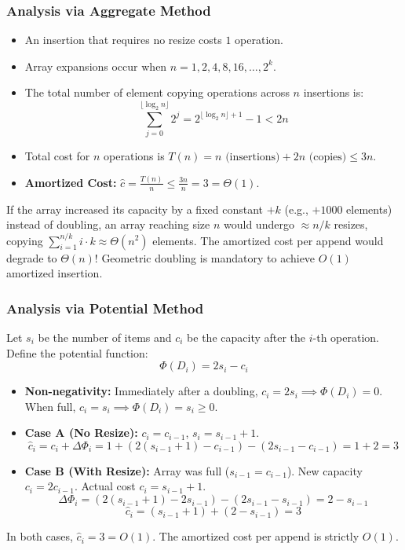 \documentclass[11pt,a4paper]{article}
\begin{document}
\subsubsection{Analysis via Aggregate Method}
\begin{itemize}[itemsep=2pt]
    \item An insertion that requires no resize costs $1$ operation.
    \item Array expansions occur when $n = 1, 2, 4, 8, 16, \dots, 2^k$.
    \item The total number of element copying operations across $n$ insertions is:
    \[
    \sum_{j=0}^{\lfloor \log_2 n \rfloor} 2^j = 2^{\lfloor \log_2 n \rfloor + 1} - 1 < 2n
    \]
    \item Total cost for $n$ operations is $T(n) = n \text{ (insertions)} + 2n \text{ (copies)} \le 3n$.
    \item \textbf{Amortized Cost:} $\hat{c} = \frac{T(n)}{n} \le \frac{3n}{n} = 3 = \Theta(1)$.
\end{itemize}

\begin{notebox}
If the array increased its capacity by a fixed constant $+k$ (e.g., $+1000$ elements) instead of doubling, an array reaching size $n$ would undergo $\approx n/k$ resizes, copying $\sum_{i=1}^{n/k} i \cdot k \approx \Theta(n^2)$ elements. The amortized cost per append would degrade to $\Theta(n)$! Geometric doubling is mandatory to achieve $O(1)$ amortized insertion.
\end{notebox}

\subsubsection{Analysis via Potential Method}
Let $s_i$ be the number of items and $c_i$ be the capacity after the $i$-th operation. Define the potential function:
\[
\Phi(D_i) = 2 s_i - c_i
\]
\begin{itemize}[itemsep=2pt]
    \item \textbf{Non-negativity:} Immediately after a doubling, $c_i = 2 s_i \implies \Phi(D_i) = 0$. When full, $c_i = s_i \implies \Phi(D_i) = s_i \ge 0$.
    \item \textbf{Case A (No Resize):} $c_i = c_{i-1}$, $s_i = s_{i-1} + 1$.
    \[
    \hat{c}_i = c_i + \Delta\Phi_i = 1 + (2(s_{i-1} + 1) - c_{i-1}) - (2 s_{i-1} - c_{i-1}) = 1 + 2 = 3
    \]
    \item \textbf{Case B (With Resize):} Array was full ($s_{i-1} = c_{i-1}$). New capacity $c_i = 2 c_{i-1}$. Actual cost $c_i = s_{i-1} + 1$.
    \[
    \Delta\Phi_i = (2(s_{i-1} + 1) - 2 s_{i-1}) - (2 s_{i-1} - s_{i-1}) = 2 - s_{i-1}
    \]
    \[
    \hat{c}_i = (s_{i-1} + 1) + (2 - s_{i-1}) = 3
    \]
\end{itemize}
In both cases, $\hat{c}_i = 3 = O(1)$. The amortized cost per append is strictly $O(1)$.
\end{document}
